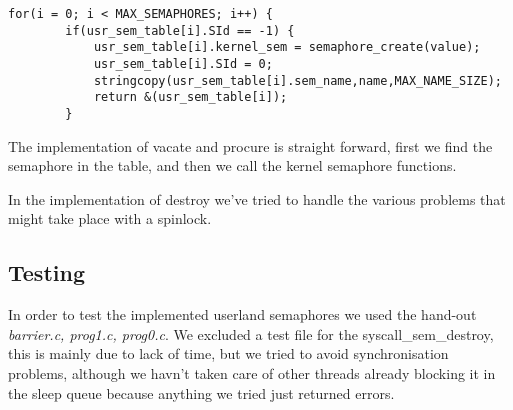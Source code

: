 \documentclass[12pt,a4paper,danish]{article}
\begin{document}
\begin{lstlisting}[caption=Creation of new userland semaphores]
    for(i = 0; i < MAX_SEMAPHORES; i++) {
        if(usr_sem_table[i].SId == -1) {
            usr_sem_table[i].kernel_sem = semaphore_create(value);
            usr_sem_table[i].SId = 0;
            stringcopy(usr_sem_table[i].sem_name,name,MAX_NAME_SIZE);
            return &(usr_sem_table[i]);
        }
\end{lstlisting}
The implementation of vacate and procure is straight forward, first we find the semaphore in the table, and then we call the kernel semaphore functions.

In the implementation of destroy we've tried to handle the various problems that might take place with a spinlock. 

\subsection{Testing}
In order to test the implemented userland semaphores we used the hand-out \textit{barrier.c, prog1.c, prog0.c}. We excluded a test file for the syscall\_sem\_destroy, this is mainly due to lack of time, but we tried to avoid synchronisation problems, although we havn't taken care of other threads already blocking it in the sleep queue because anything we tried just returned errors.
\end{document}
